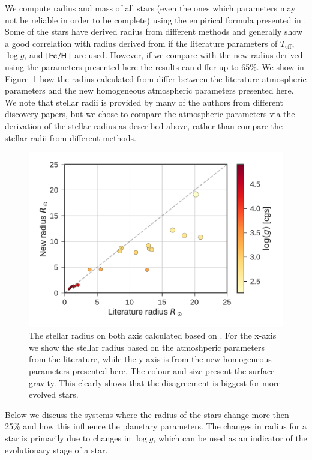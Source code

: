 \documentclass{aa}
\begin{document}
We compute radius and mass of all stars (even the ones which parameters may not
be reliable in order to be complete) using the empirical formula presented in
\citet{Torres2010}. Some of the stars have derived radius from different methods
and generally show a good correlation with radius derived from
\citet{Torres2010} if the literature parameters of $T_\mathrm{eff}$, $\log g$,
and $[\ion{Fe}/\ion{H}]$ are used. However, if we compare with the new radius
derived using the parameters presented here the results can differ up to 65\%.
We show in Figure~\ref{fig:RR} how the radius calculated from \citet{Torres2010}
differ between the literature atmospheric parameters and the new homogeneous
atmospheric parameters presented here. We note that stellar radii is provided by
many of the authors from different discovery papers, but we chose to compare the
atmospheric parameters via the derivation of the stellar radius as described
above, rather than compare the stellar radii from different methods.

\begin{figure}[tpb]
    \centering
    \includegraphics[width=1.0\linewidth]{figures/radiusVSradius.pdf}
    \caption{The stellar radius on both axis calculated based on \citet{Torres2010}.
    For the x-axis we show the stellar radius based on the atmoshperic parameters
    from the literature, while the y-axis is from the new homogeneous parameters
    presented here. The colour and size present the surface gravity. This clearly
    shows that the disagreement is biggest for more evolved stars.}
    \label{fig:RR}
\end{figure}

Below we discuss the systems where the radius of the stars change more then 25\%
and how this influence the planetary parameters. The changes in radius for a
star is primarily due to changes in $\log g$, which can be used as an indicator
of the evolutionary stage of a star.
\end{document}
